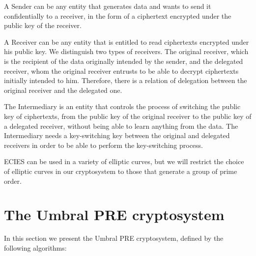\documentclass[12pt]{article}
\begin{document}
A Sender can  be any entity that generates data and wants to send it confidentially to a receiver, in the form of a ciphertext encrypted under the public key of the receiver. 

A Receiver can be any entity that is entitled to read ciphertexts encrypted under his public key. We distinguish two types of receivers. The original receiver, which is the recipient of the data originally intended by the sender, and the delegated receiver, whom the original receiver entrusts to be able to decrypt ciphertexts initially intended to him. Therefore, there is a relation of delegation between the original receiver and the delegated one. 

The Intermediary is an entity that controls the process of switching the public key of ciphertexts, from the public key of the original receiver to the public key of a delegated receiver, without being able to learn anything from the data. The Intermediary needs a key-switching key between the original and delegated receivers in order to be able to perform the key-switching process.

ECIES can be used in a variety of elliptic curves, but we will restrict the choice of elliptic curves in our cryptosystem to those that generate a group of prime order. %

\section{The Umbral PRE cryptosystem}

In this section we present the Umbral PRE cryptosystem, defined by the following algorithms:
\end{document}
